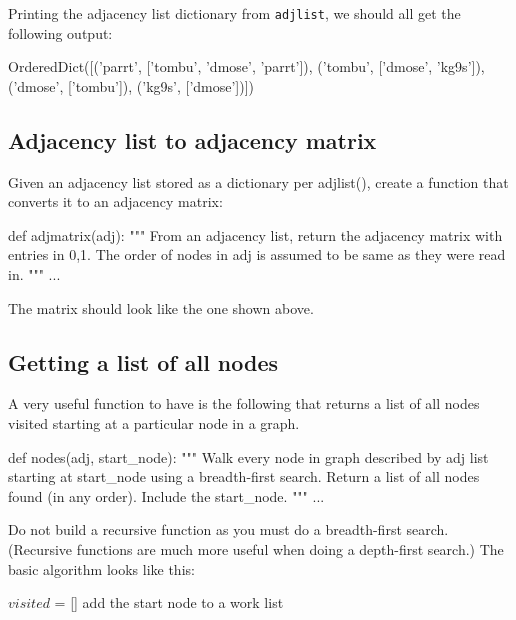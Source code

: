 \begin{fullwidth}
\noindent Printing the adjacency list dictionary from {\tt adjlist}, we should all get the following output:

\begin{pyverbatim}
OrderedDict([('parrt', ['tombu', 'dmose', 'parrt']),
 ('tombu', ['dmose', 'kg9s']), 
 ('dmose', ['tombu']), 
 ('kg9s', ['dmose'])])
\end{pyverbatim}

\subsection{Adjacency list to adjacency matrix}

Given an adjacency list stored as a dictionary per adjlist(), create a function that converts it to an adjacency matrix:
 
\begin{pyverbatim}
def adjmatrix(adj):
    """
    From an adjacency list, return the adjacency matrix with entries in {0,1}.
    The order of nodes in adj is assumed to be same as they were read in.
    """
    ...
\end{pyverbatim}

\noindent The matrix should look like the one shown above.

\subsection{Getting a list of all nodes}

A very useful function to have is the following that returns a list of all nodes visited starting at a particular node in a graph. 
 
\begin{pyverbatim}
def nodes(adj, start_node):
    """
    Walk every node in graph described by adj list starting at start_node
    using a breadth-first search.  Return a list of all nodes found (in
    any order). Include the start_node.
    """
    ...
\end{pyverbatim}

\noindent Do not build a recursive function as you must do a breadth-first search. (Recursive functions are much more useful when doing a depth-first search.) The basic algorithm looks like this:

\begin{algorithm}[H]
\SetInd{.3em}{.3em}
$visited$ = []\;
add the start node to a work list\;
\;
\end{algorithm}


\end{fullwidth}
